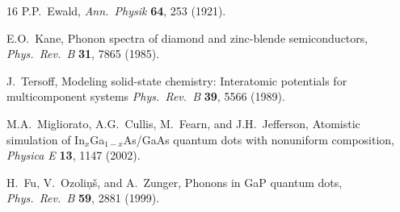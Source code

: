 \documentclass[12pt]{article}
\begin{document}
\begin{thebibliography}{16}
P.P.~Ewald,
\emph{Ann.\ Physik} {\bf 64}, 253 (1921).

E.O.\ Kane,
Phonon spectra of diamond and zinc-blende semiconductors,
\emph{Phys.\ Rev.\ B} {\bf 31}, 7865 (1985).

J.\ Tersoff,
Modeling solid-state chemistry: Interatomic potentials for
multicomponent systems
\emph{Phys.\ Rev.\ B} {\bf 39}, 5566 (1989).

M.A.\ Migliorato, A.G.\ Cullis, M.\ Fearn, and J.H.\ Jefferson,
Atomistic simulation of In$_x$Ga$_{1-x}$As/GaAs
quantum dots with nonuniform composition,
\emph{Physica E} {\bf 13}, 1147 (2002).

H.\ Fu, V.\ Ozoli\c{n}\v{s}, and A.\ Zunger,
Phonons in GaP quantum dots,
\emph{Phys.\ Rev.\ B} {\bf 59}, 2881 (1999).

\end{thebibliography}
\end{document}
